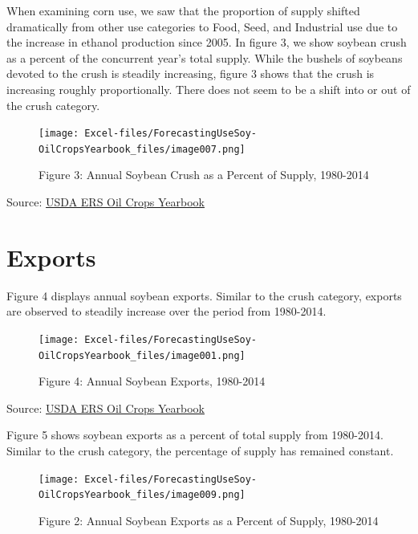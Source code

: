 \documentclass[
  letterpaper,
  DIV=11,
  numbers=noendperiod]{scrreprt}
\begin{document}
When examining corn use, we saw that the proportion of supply shifted
dramatically from other use categories to Food, Seed, and Industrial use
due to the increase in ethanol production since 2005. In figure 3, we
show soybean crush as a percent of the concurrent year's total supply.
While the bushels of soybeans devoted to the crush is steadily
increasing, figure 3 shows that the crush is increasing roughly
proportionally. There does not seem to be a shift into or out of the
crush category.

\begin{figure}[H]

{\centering \texttt{[image: Excel-files/ForecastingUseSoy-OilCropsYearbook\_files/image007.png]}

}

\caption{Figure 3: Annual Soybean Crush as a Percent of Supply,
1980-2014}

\end{figure}%

Source:
\href{http://www.ers.usda.gov/data-products/oil-crops-yearbook.aspx}{USDA
ERS Oil Crops Yearbook}

\section{Exports}\label{exports-2}

Figure 4 displays annual soybean exports. Similar to the crush category,
exports are observed to steadily increase over the period from
1980-2014.

\begin{figure}[H]

{\centering \texttt{[image: Excel-files/ForecastingUseSoy-OilCropsYearbook\_files/image001.png]}

}

\caption{Figure 4: Annual Soybean Exports, 1980-2014}

\end{figure}%

Source:
\href{http://www.ers.usda.gov/data-products/oil-crops-yearbook.aspx}{USDA
ERS Oil Crops Yearbook}

Figure 5 shows soybean exports as a percent of total supply from
1980-2014. Similar to the crush category, the percentage of supply has
remained constant.

\begin{figure}[H]

{\centering \texttt{[image: Excel-files/ForecastingUseSoy-OilCropsYearbook\_files/image009.png]}

}

\caption{Figure 2: Annual Soybean Exports as a Percent of Supply,
1980-2014}

\end{figure}%
\end{document}
